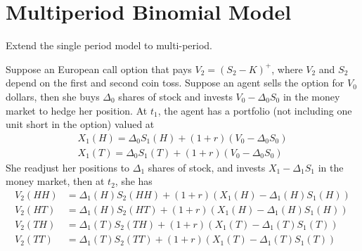\documentclass[a4paper]{article}
\begin{document}
\section{Multiperiod Binomial Model}
Extend the single period model to multi-period.
\begin{center}
\end{center}
Suppose an European call option that pays $V_2 = (S_2-K)^+$, where $V_2$ and $S_2$ depend on the first and second coin toss. Suppose an agent sells the option for $V_0$ dollars, then she buys $\Delta_0$ shares of stock and invests $V_0-\Delta_0 S_0$ in the money market to hedge her position. At $t_1$, the agent has a portfolio (not including one unit short in the option) valued at 
\begin{align*}
X_1(H) = \Delta_0 S_1(H) + (1+r)(V_0-\Delta_0S_0)\\
X_1(T) = \Delta_0 S_1(T) + (1+r)(V_0-\Delta_0S_0)
\end{align*}
She readjust her positions to $\Delta_1$ shares of stock, and invests $X_1-\Delta_1S_1$ in the money market, then at $t_2$, she has
\begin{align*}
V_2(HH) &= \Delta_1(H)S_2(HH)+(1+r)(X_1(H)-\Delta_1(H)S_1(H))\\
V_2(HT) &= \Delta_1(H)S_2(HT)+(1+r)(X_1(H)-\Delta_1(H)S_1(H))\\
V_2(TH) &= \Delta_1(T)S_2(TH)+(1+r)(X_1(T)-\Delta_1(T)S_1(T))\\
V_2(TT) &= \Delta_1(T)S_2(TT)+(1+r)(X_1(T)-\Delta_1(T)S_1(T))
\end{align*}
\end{document}

